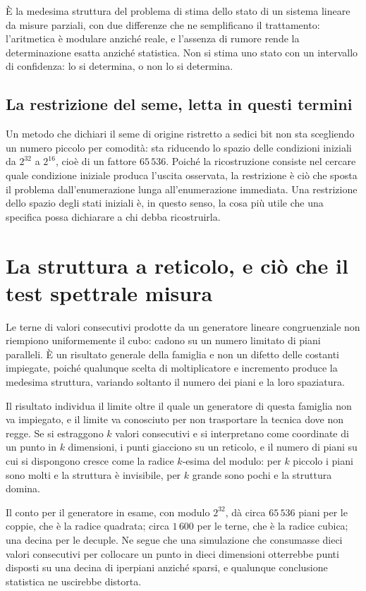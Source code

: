 È la medesima struttura del problema di stima dello stato di un sistema lineare da misure parziali, con due differenze che ne semplificano il trattamento: l'aritmetica è modulare anziché reale, e l'assenza di rumore rende la determinazione esatta anziché statistica. Non si stima uno stato con un intervallo di confidenza: lo si determina, o non lo si determina.

\subsection*{La restrizione del seme, letta in questi termini}

Un metodo che dichiari il seme di origine ristretto a sedici bit non sta scegliendo un numero piccolo per comodità: sta riducendo lo spazio delle condizioni iniziali da $2^{32}$ a $2^{16}$, cioè di un fattore $65\,536$. Poiché la ricostruzione consiste nel cercare quale condizione iniziale produca l'uscita osservata, la restrizione è ciò che sposta il problema dall'enumerazione lunga all'enumerazione immediata. Una restrizione dello spazio degli stati iniziali è, in questo senso, la cosa più utile che una specifica possa dichiarare a chi debba ricostruirla.

\section{La struttura a reticolo, e ciò che il test spettrale misura}

Le terne di valori consecutivi prodotte da un generatore lineare congruenziale non riempiono uniformemente il cubo: cadono su un numero limitato di piani paralleli. È un risultato generale della famiglia e non un difetto delle costanti impiegate, poiché qualunque scelta di moltiplicatore e incremento produce la medesima struttura, variando soltanto il numero dei piani e la loro spaziatura.

Il risultato individua il limite oltre il quale un generatore di questa famiglia non va impiegato, e il limite va conosciuto per non trasportare la tecnica dove non regge. Se si estraggono $k$ valori consecutivi e si interpretano come coordinate di un punto in $k$ dimensioni, i punti giacciono su un reticolo, e il numero di piani su cui si dispongono cresce come la radice $k$-esima del modulo: per $k$ piccolo i piani sono molti e la struttura è invisibile, per $k$ grande sono pochi e la struttura domina.

Il conto per il generatore in esame, con modulo $2^{32}$, dà circa $65\,536$ piani per le coppie, che è la radice quadrata; circa $1\,600$ per le terne, che è la radice cubica; una decina per le decuple. Ne segue che una simulazione che consumasse dieci valori consecutivi per collocare un punto in dieci dimensioni otterrebbe punti disposti su una decina di iperpiani anziché sparsi, e qualunque conclusione statistica ne uscirebbe distorta.

